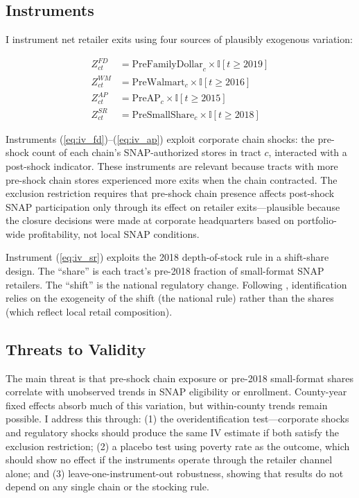 \documentclass[12pt]{article}
\newcommand{\ind}{\mathbb{I}}
\begin{document}
\subsection{Instruments}

I instrument net retailer exits using four sources of plausibly exogenous variation:

\begin{align}
Z^{FD}_{ct} &= \text{PreFamilyDollar}_c \times \ind[t \geq 2019] \label{eq:iv_fd} \\
Z^{WM}_{ct} &= \text{PreWalmart}_c \times \ind[t \geq 2016] \label{eq:iv_wm} \\
Z^{AP}_{ct} &= \text{PreAP}_c \times \ind[t \geq 2015] \label{eq:iv_ap} \\
Z^{SR}_{ct} &= \text{PreSmallShare}_c \times \ind[t \geq 2018] \label{eq:iv_sr}
\end{align}

Instruments (\ref{eq:iv_fd})--(\ref{eq:iv_ap}) exploit corporate chain shocks: the pre-shock count of each chain's SNAP-authorized stores in tract $c$, interacted with a post-shock indicator. These instruments are relevant because tracts with more pre-shock chain stores experienced more exits when the chain contracted. The exclusion restriction requires that pre-shock chain presence affects post-shock SNAP participation only through its effect on retailer exits---plausible because the closure decisions were made at corporate headquarters based on portfolio-wide profitability, not local SNAP conditions.

Instrument (\ref{eq:iv_sr}) exploits the 2018 depth-of-stock rule in a shift-share design. The ``share'' is each tract's pre-2018 fraction of small-format SNAP retailers. The ``shift'' is the national regulatory change. Following \citet{borusyak2022}, identification relies on the exogeneity of the shift (the national rule) rather than the shares (which reflect local retail composition).

\subsection{Threats to Validity}

The main threat is that pre-shock chain exposure or pre-2018 small-format shares correlate with unobserved trends in SNAP eligibility or enrollment. County-year fixed effects absorb much of this variation, but within-county trends remain possible. I address this through: (1) the overidentification test---corporate shocks and regulatory shocks should produce the same IV estimate if both satisfy the exclusion restriction; (2) a placebo test using poverty rate as the outcome, which should show no effect if the instruments operate through the retailer channel alone; and (3) leave-one-instrument-out robustness, showing that results do not depend on any single chain or the stocking rule.
\end{document}
